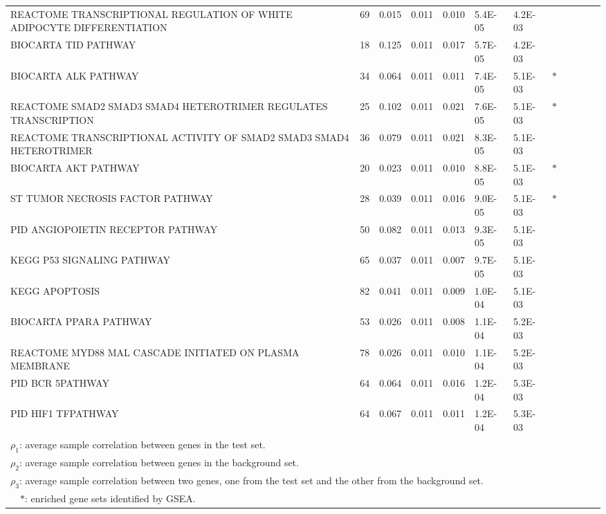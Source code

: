 \documentclass[useAMS,usenatbib, galley]{biom}
\begin{document}
\begin{table*}[!ht]
\begin{tabular}{p{3in}rp{0.5in}p{0.5in}rp{0.5in}p{0.5in}rp{0.5in}p{0.5in}lp{0.1in}}
		REACTOME TRANSCRIPTIONAL REGULATION OF WHITE ADIPOCYTE DIFFERENTIATION & 69 & 0.015 & 0.011 & 0.010 & 5.4E-05 & 4.2E-03 &  \\ 
		BIOCARTA TID PATHWAY & 18 & 0.125 & 0.011 & 0.017 & 5.7E-05 & 4.2E-03 &  \\ 
		BIOCARTA ALK PATHWAY & 34 & 0.064 & 0.011 & 0.011 & 7.4E-05 & 5.1E-03 & $\ast$ \\ 
		REACTOME SMAD2 SMAD3 SMAD4 HETEROTRIMER REGULATES TRANSCRIPTION & 25 & 0.102 & 0.011 & 0.021 & 7.6E-05 & 5.1E-03 & $\ast$ \\ 
		REACTOME TRANSCRIPTIONAL ACTIVITY OF SMAD2 SMAD3 SMAD4 HETEROTRIMER & 36 & 0.079 & 0.011 & 0.021 & 8.3E-05 & 5.1E-03 &  \\ 
		BIOCARTA AKT PATHWAY & 20 & 0.023 & 0.011 & 0.010 & 8.8E-05 & 5.1E-03 & $\ast$ \\ 
		ST TUMOR NECROSIS FACTOR PATHWAY & 28 & 0.039 & 0.011 & 0.016 & 9.0E-05 & 5.1E-03 & $\ast$ \\ 
		PID ANGIOPOIETIN RECEPTOR PATHWAY & 50 & 0.082 & 0.011 & 0.013 & 9.3E-05 & 5.1E-03 &  \\ 
		KEGG P53 SIGNALING PATHWAY & 65 & 0.037 & 0.011 & 0.007 & 9.7E-05 & 5.1E-03 &  \\ 
		KEGG APOPTOSIS & 82 & 0.041 & 0.011 & 0.009 & 1.0E-04 & 5.1E-03 &  \\ 
		BIOCARTA PPARA PATHWAY & 53 & 0.026 & 0.011 & 0.008 & 1.1E-04 & 5.2E-03 &  \\ 
		REACTOME MYD88 MAL CASCADE INITIATED ON PLASMA MEMBRANE & 78 & 0.026 & 0.011 & 0.010 & 1.1E-04 & 5.2E-03 &  \\ 
		PID BCR 5PATHWAY & 64 & 0.064 & 0.011 & 0.016 & 1.2E-04 & 5.3E-03 &  \\ 
		PID HIF1 TFPATHWAY & 64 & 0.067 & 0.011 & 0.011 & 1.2E-04 & 5.3E-03 &  \\ 
		\hline\hline
		\multicolumn{7}{l}{$\rho_1$: average sample correlation between genes in the test set. }	 \\	
		\multicolumn{7}{l}{$\rho_2$: average sample correlation between genes in the background set. }	 \\	
		\multicolumn{7}{l}{$\rho_3$: average sample correlation between two genes, one from the test set and the other from the background set. }	 \\	
		\multicolumn{7}{l}{ ~~$\ast$: enriched gene sets identified by GSEA.}	 \\	
	\end{tabular}
\label{table:top30}
\end{table*}
\end{document}
